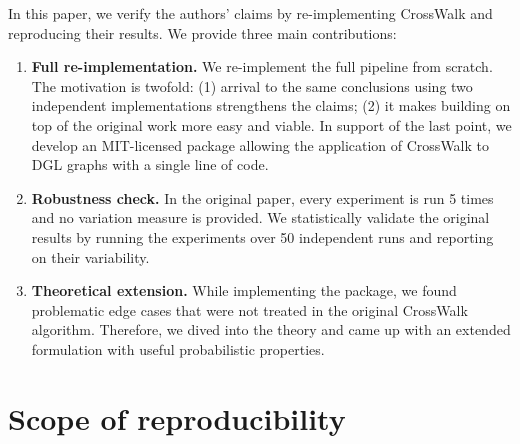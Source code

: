 In this paper, we verify the authors' claims by re-implementing CrossWalk and reproducing their results. We provide three main contributions:
\begin{enumerate}
    \item \textbf{Full re-implementation.} We re-implement the full pipeline from scratch. The motivation is twofold: (1) arrival to the same conclusions using two independent implementations strengthens the claims; (2) it makes building on top of the original work more easy and viable. In support of the last point, we develop an MIT-licensed package allowing the application of CrossWalk to \ac{DGL} graphs with a single line of code.
    \item \textbf{Robustness check.} In the original paper, every experiment is run 5 times and no variation measure is provided. We statistically validate the original results by running the experiments over 50 independent runs and reporting on their variability.
    \item \textbf{Theoretical extension.} While implementing the package, we found problematic edge cases that were not treated in the original CrossWalk algorithm. Therefore, we dived into the theory and came up with an extended formulation with useful probabilistic properties.
\end{enumerate}

\section{Scope of reproducibility}
\label{sec:claims}


